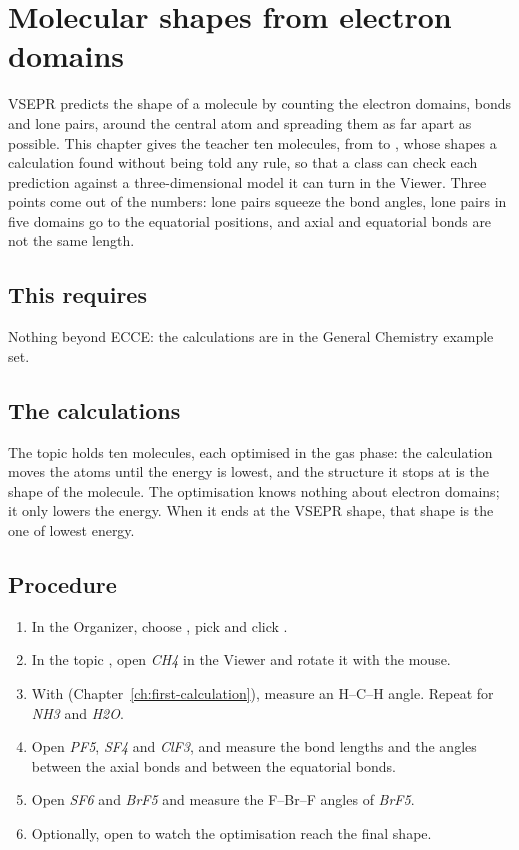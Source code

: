 \chapter{Molecular shapes from electron domains}
\label{ch:t-shapes}

VSEPR predicts the shape of a molecule by counting the electron domains, bonds and lone pairs, around the central atom and spreading them as far apart as possible. This chapter gives the teacher ten molecules, from  to , whose shapes a calculation found without being told any rule, so that a class can check each prediction against a three-dimensional model it can turn in the Viewer. Three points come out of the numbers: lone pairs squeeze the bond angles, lone pairs in five domains go to the equatorial positions, and axial and equatorial bonds are not the same length.

\section*{This requires}
Nothing beyond ECCE: the calculations are in the General Chemistry example set.

\section{The calculations}
The topic  holds ten molecules, each optimised in the gas phase: the calculation moves the atoms until the energy is lowest, and the structure it stops at is the shape of the molecule. The optimisation knows nothing about electron domains; it only lowers the energy. When it ends at the VSEPR shape, that shape is the one of lowest energy.

\section{Procedure}
\begin{enumerate}
	\item In the Organizer, choose , pick  and click .
	\item In the topic , open \emph{CH4} in the Viewer and rotate it with the mouse.
	\item With  (Chapter~\ref{ch:first-calculation}), measure an H--C--H angle. Repeat for \emph{NH3} and \emph{H2O}.
	\item Open \emph{PF5}, \emph{SF4} and \emph{ClF3}, and measure the bond lengths and the angles between the axial bonds and between the equatorial bonds.
	\item Open \emph{SF6} and \emph{BrF5} and measure the F--Br--F angles of \emph{BrF5}.
	\item Optionally, open  to watch the optimisation reach the final shape.
\end{enumerate}

